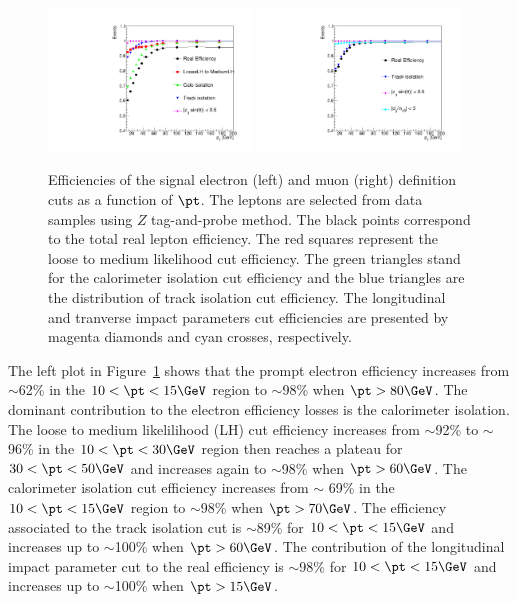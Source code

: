 \begin{figure}[htbp]
\begin{center}
\includegraphics[width=0.48\textwidth]{cut_efficiency_electron}
\includegraphics[width=0.48\textwidth]{cut_efficiency_muon}
\caption{Efficiencies of the signal electron (left) and muon (right) definition cuts as a function of $\pt$.
The leptons are selected from data samples using $Z$ tag-and-probe method. The black points correspond to the total real lepton efficiency.
The red squares represent the loose to medium likelihood cut efficiency. The green triangles stand for the calorimeter isolation cut efficiency and the blue triangles are the distribution of track isolation cut efficiency.
The longitudinal and tranverse impact parameters cut efficiencies are presented by magenta diamonds and cyan crosses, respectively.
}
\label{fig:RLE_cut_efficiencies}
\end{center}
\end{figure}

The left plot in Figure~\ref{fig:RLE_cut_efficiencies} shows that the prompt electron efficiency increases from $\sim$62\% in the $10<\pt<15 \GeV$ region to $\sim$98\% when $\pt>80 \GeV$.
The dominant contribution to the electron efficiency losses is the calorimeter isolation.
The loose to medium likelilihood (LH) cut efficiency increases from $\sim$92\% to $\sim$96\% in the $10<\pt<30 \GeV$ region then reaches a plateau for $30<\pt<50 \GeV$ and increases again to $\sim$98\% when $\pt>60 \GeV$.
The calorimeter isolation cut efficiency increases from $\sim$ 69\% in the $10<\pt<15 \GeV$ region to $\sim$98\% when $\pt>70 \GeV$.
The efficiency associated to the track isolation cut is $\sim$89\% for $10<\pt<15 \GeV$ and increases up to $\sim$100\% when $\pt>60 \GeV$.
The contribution of the longitudinal impact parameter cut to the real efficiency is $\sim$98\% for $10<\pt<15 \GeV$ and increases up to $\sim$100\% when $\pt>15 \GeV$.

